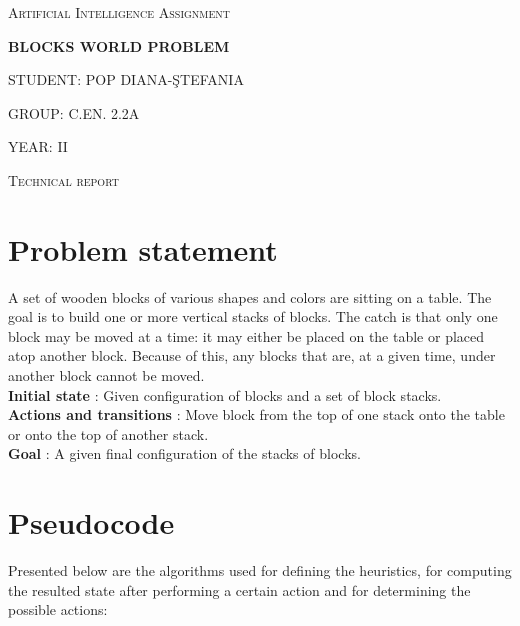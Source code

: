 \documentclass{article}
\begin{document}
\begin{titlepage}
	\centering
    \vspace{3cm}
	{\scshape\Large Artificial Intelligence Assignment \par}
	\vspace{4cm}
	{\huge\bfseries\LARGE BLOCKS WORLD PROBLEM \par}
	\vspace{2cm}
	{\Large STUDENT: POP DIANA-\c{S}TEFANIA\par}
	\vspace{1cm}
	{\Large GROUP: C.EN. 2.2A\par}
	\vspace{1cm}
	{\Large YEAR: II\par}
	\vspace{1cm}
	\vfill
\end{titlepage}

\begin{centering}
\vspace{1cm}
{\scshape\Large Technical report \par}
\end{centering}
\vspace{1.5cm}
\section{Problem statement}
A set of wooden blocks of various shapes and colors are sitting on a table. The goal is to build one or more vertical stacks of blocks. The catch is that only one block may be moved at a time: it may either be placed on the table or placed atop another block. Because of this, any blocks that are, at a given time, under another block cannot be moved. 
\\
\textbf{Initial state} : Given configuration of blocks and a set of block stacks.
\\
\textbf{Actions and transitions} : Move block from the top of one stack onto the table or onto the top of another stack.
\\
\textbf{Goal} : A given final configuration of the stacks of blocks.
\\


\section{Pseudocode}

Presented below are the algorithms used for defining the heuristics, for computing the resulted state after performing a certain action and for determining the possible actions:
\end{document}
